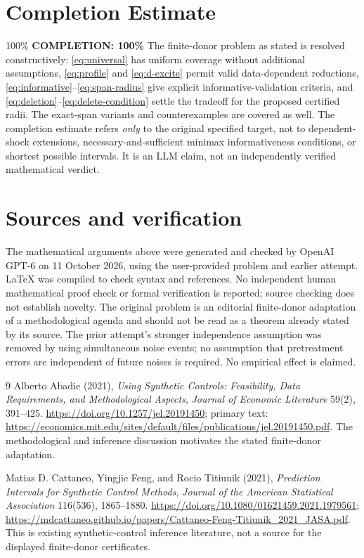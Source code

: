 \documentclass[11pt,a4paper]{article}
\begin{document}
\section{Completion Estimate}
100\%
\noindent\textbf{COMPLETION: 100\%}
The finite-donor problem as stated is resolved constructively: \eqref{eq:universal} has uniform coverage without additional assumptions, \eqref{eq:profile} and \eqref{eq:d-excite} permit valid data-dependent reductions, \eqref{eq:informative}--\eqref{eq:span-radius} give explicit informative-validation criteria, and \eqref{eq:deletion}--\eqref{eq:delete-condition} settle the tradeoff for the proposed certified radii. The exact-span variants and counterexamples are covered as well. The completion estimate refers \emph{only} to the original specified target, not to dependent-shock extensions, necessary-and-sufficient minimax informativeness conditions, or shortest possible intervals. It is an LLM claim, not an independently verified mathematical verdict.

\section*{Sources and verification}
The mathematical arguments above were generated and checked by OpenAI GPT-6 on 11 October 2026, using the user-provided problem and earlier attempt. LaTeX was compiled to check syntax and references. No independent human mathematical proof check or formal verification is reported; source checking does not establish novelty. The original problem is an editorial finite-donor adaptation of a methodological agenda and should not be read as a theorem already stated by its source. The prior attempt's stronger independence assumption was removed by using simultaneous noise events; no assumption that pretreatment errors are independent of future noises is required. No empirical effect is claimed.

\begin{thebibliography}{9}
Alberto Abadie (2021), \emph{Using Synthetic Controls: Feasibility, Data Requirements, and Methodological Aspects},
\emph{Journal of Economic Literature} 59(2), 391--425.
\url{https://doi.org/10.1257/jel.20191450}; primary text:
\url{https://economics.mit.edu/sites/default/files/publications/jel.20191450.pdf}.
The methodological and inference discussion motivates the stated finite-donor adaptation.

Matias D. Cattaneo, Yingjie Feng, and Rocio Titiunik (2021),
\emph{Prediction Intervals for Synthetic Control Methods},
\emph{Journal of the American Statistical Association} 116(536), 1865--1880.
\url{https://doi.org/10.1080/01621459.2021.1979561};
\url{https://mdcattaneo.github.io/papers/Cattaneo-Feng-Titiunik_2021_JASA.pdf}.
This is existing synthetic-control inference literature, not a source for the displayed finite-donor certificates.
\end{thebibliography}
\end{document}
